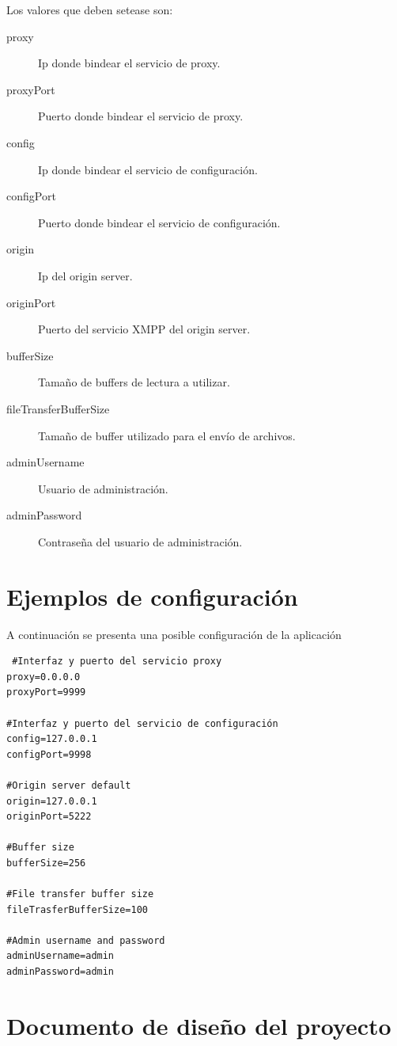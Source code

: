 \documentclass[a4paper,10pt]{article}
\begin{document}
Los valores que deben setease son:
\begin{description}
 \item [proxy] Ip donde bindear el servicio de proxy.
 \item [proxyPort] Puerto donde bindear el servicio de proxy.
 \item [config] Ip donde bindear el servicio de configuración.
 \item [configPort] Puerto donde bindear el servicio de configuración.
 \item [origin] Ip del origin server.
 \item [originPort] Puerto del servicio XMPP del origin server.
 \item [bufferSize] Tamaño de buffers de lectura a utilizar.
 \item [fileTransferBufferSize] Tamaño de buffer utilizado para el envío de archivos.
 \item [adminUsername] Usuario de administración.
 \item [adminPassword] Contraseña del usuario de administración.

\end{description}

\section{Ejemplos de configuración}
A continuación se presenta una posible configuración de la aplicación

\begin{verbatim}
 #Interfaz y puerto del servicio proxy
proxy=0.0.0.0
proxyPort=9999

#Interfaz y puerto del servicio de configuración
config=127.0.0.1
configPort=9998

#Origin server default
origin=127.0.0.1
originPort=5222

#Buffer size
bufferSize=256

#File transfer buffer size
fileTrasferBufferSize=100

#Admin username and password
adminUsername=admin
adminPassword=admin
\end{verbatim}


\section{Documento de diseño del proyecto}
\end{document}
